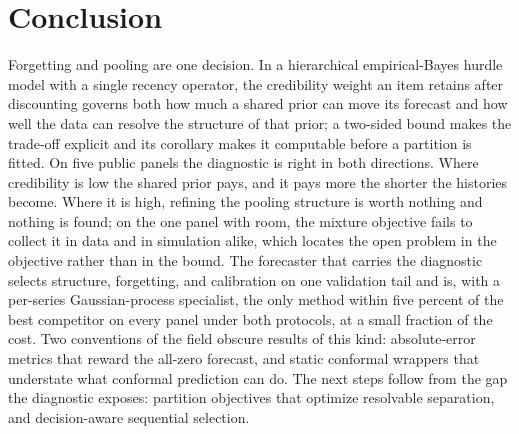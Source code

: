 \documentclass[twoside]{article}
\theoremstyle{definition}
\begin{document}
\section{Conclusion}\label{sec:conclusion}

Forgetting and pooling are one decision. In a hierarchical
empirical-Bayes hurdle model with a single recency operator, the
credibility weight an item retains after discounting governs both how
much a shared prior can move its forecast and how well the data can
resolve the structure of that prior; a two-sided bound makes the
trade-off explicit and its corollary makes it computable before a
partition is fitted. On five public panels the diagnostic is right in
both directions. Where credibility is low the shared prior pays, and it
pays more the shorter the histories become. Where it is high, refining
the pooling structure is worth nothing and nothing is found; on the one
panel with room, the mixture objective fails to collect it in data and in
simulation alike, which locates the open problem in the objective rather
than in the bound. The forecaster that carries the diagnostic selects
structure, forgetting, and calibration on one validation tail and is,
with a per-series Gaussian-process specialist, the only method within
five percent of the best competitor on every panel under both protocols,
at a small fraction of the cost. Two conventions of the field obscure
results of this kind: absolute-error metrics that reward the all-zero
forecast, and static conformal wrappers that understate what conformal
prediction can do. The next steps follow from the gap the diagnostic
exposes: partition objectives that optimize resolvable separation, and
decision-aware sequential selection.
\end{document}
